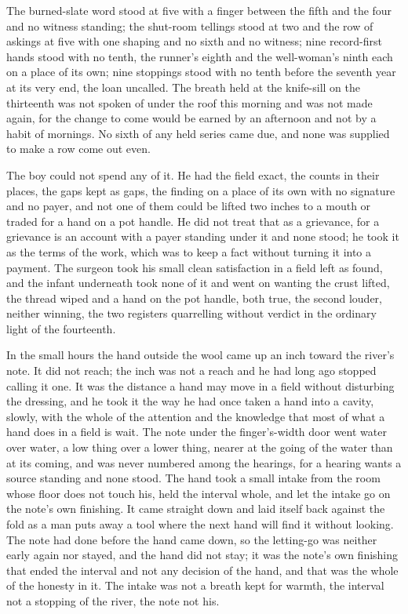 The burned-slate word stood at five with a finger between the fifth and the four and no witness standing; the shut-room tellings stood at two and the row of askings at five with one shaping and no sixth and no witness; nine record-first hands stood with no tenth, the runner's eighth and the well-woman's ninth each on a place of its own; nine stoppings stood with no tenth before the seventh year at its very end, the loan uncalled. The breath held at the knife-sill on the thirteenth was not spoken of under the roof this morning and was not made again, for the change to come would be earned by an afternoon and not by a habit of mornings. No sixth of any held series came due, and none was supplied to make a row come out even.

The boy could not spend any of it. He had the field exact, the counts in their places, the gaps kept as gaps, the finding on a place of its own with no signature and no payer, and not one of them could be lifted two inches to a mouth or traded for a hand on a pot handle. He did not treat that as a grievance, for a grievance is an account with a payer standing under it and none stood; he took it as the terms of the work, which was to keep a fact without turning it into a payment. The surgeon took his small clean satisfaction in a field left as found, and the infant underneath took none of it and went on wanting the crust lifted, the thread wiped and a hand on the pot handle, both true, the second louder, neither winning, the two registers quarrelling without verdict in the ordinary light of the fourteenth.

In the small hours the hand outside the wool came up an inch toward the river's note. It did not reach; the inch was not a reach and he had long ago stopped calling it one. It was the distance a hand may move in a field without disturbing the dressing, and he took it the way he had once taken a hand into a cavity, slowly, with the whole of the attention and the knowledge that most of what a hand does in a field is wait. The note under the finger's-width door went water over water, a low thing over a lower thing, nearer at the going of the water than at its coming, and was never numbered among the hearings, for a hearing wants a source standing and none stood. The hand took a small intake from the room whose floor does not touch his, held the interval whole, and let the intake go on the note's own finishing. It came straight down and laid itself back against the fold as a man puts away a tool where the next hand will find it without looking. The note had done before the hand came down, so the letting-go was neither early again nor stayed, and the hand did not stay; it was the note's own finishing that ended the interval and not any decision of the hand, and that was the whole of the honesty in it. The intake was not a breath kept for warmth, the interval not a stopping of the river, the note not his.

